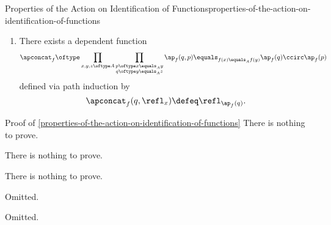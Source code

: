 \begin{proposition}{Properties of the Action on Identification of Functions}{properties-of-the-action-on-identification-of-functions}
\begin{enumerate}
\[                \prod_{x,y\oftype A}%
                \prod_{p\oftype x\equals_{A}y}%
                \ap_{f}\pig(p^{-1}\pig)%
                \equals_{f(x)\equals_{A}f(y)}%
                \ap_{f}(p)^{-1}%
            \]%
            defined via path induction by
            \[
                \apinv_{f}(\refl_{x})%
                \defeq%
                \refl_{\ap_{f}(\refl_{x})}.%
            \]%
        \item\label{properties-of-the-action-on-identification-of-functions-interaction-with-concatenation}There exists a dependent function
            \[
                \apconcat_{f}%
                \oftype%
                \prod_{x,y,z\oftype A}%
                \prod_{\substack{p\oftype x\equals_{A}y\\q\oftype y\equals_{A}z}}%
                \ap_{f}(q,p)%
                \equals_{f(x)\equals_{A}f(y)}%
                \ap_{f}(q)\ccirc\ap_{f}(p)%
            \]%
            defined via path induction by
            \[
                \apconcat_{f}(q,\refl_{x})%
                \defeq%
                \refl_{\ap_{f}(q)}.%
            \]%
    \end{enumerate}
\end{proposition}
\begin{Proof}{Proof of \cref{properties-of-the-action-on-identification-of-functions}}%
    There is nothing to prove.

    There is nothing to prove.

    There is nothing to prove.

    Omitted.

    Omitted.
\end{Proof}

